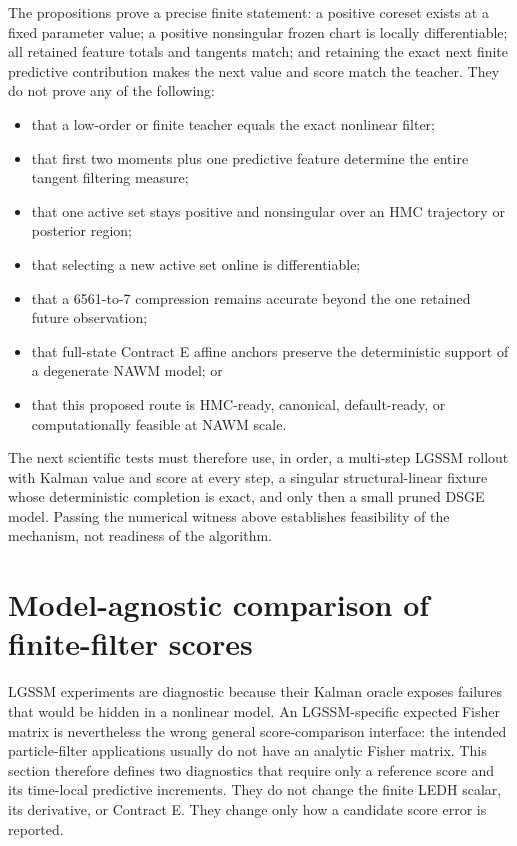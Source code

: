 The propositions prove a precise finite statement: a positive coreset exists at
a fixed parameter value; a positive nonsingular frozen chart is locally
differentiable; all retained feature totals and tangents match; and retaining
the exact next finite predictive contribution makes the next value and score
match the teacher.  They do not prove any of the following:
\begin{itemize}
  \item that a low-order or finite teacher equals the exact nonlinear filter;
  \item that first two moments plus one predictive feature determine the entire
    tangent filtering measure;
  \item that one active set stays positive and nonsingular over an HMC
    trajectory or posterior region;
  \item that selecting a new active set online is differentiable;
  \item that a 6561-to-7 compression remains accurate beyond the one retained
    future observation;
  \item that full-state Contract E affine anchors preserve the deterministic
    support of a degenerate NAWM model; or
  \item that this proposed route is HMC-ready, canonical, default-ready, or
    computationally feasible at NAWM scale.
\end{itemize}
The next scientific tests must therefore use, in order, a multi-step LGSSM
rollout with Kalman value and score at every step, a singular structural-linear
fixture whose deterministic completion is exact, and only then a small pruned
DSGE model.  Passing the numerical witness above establishes feasibility of the
mechanism, not readiness of the algorithm.

\section{Model-agnostic comparison of finite-filter scores}
\label{sec:bf-ledh-score-comparison-opg}

LGSSM experiments are diagnostic because their Kalman oracle exposes failures
that would be hidden in a nonlinear model.  An LGSSM-specific expected Fisher
matrix is nevertheless the wrong general score-comparison interface: the
intended particle-filter applications usually do not have an analytic Fisher
matrix.  This section therefore defines two diagnostics that require only a
reference score and its time-local predictive increments.  They do not change
the finite LEDH scalar, its derivative, or Contract E.  They change only how a
candidate score error is reported.

